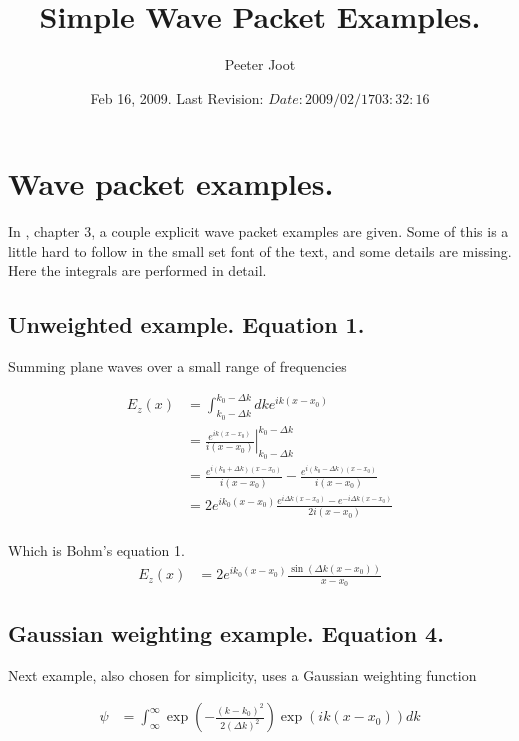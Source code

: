 \documentclass{article}
\title{ Simple Wave Packet Examples. }
\author{Peeter Joot}
\date{ Feb 16, 2009.  Last Revision: $Date: 2009/02/17 03:32:16 $ }
\begin{document}
\maketitle{}
\section{ Wave packet examples. }

In \cite{bohm1989qt}, chapter 3, a couple explicit wave packet examples are given.
Some of this is a little hard to follow in the small set font of the text, and some details are missing.  Here the integrals are performed
in detail.

\subsection{ Unweighted example. Equation 1. }

Summing plane waves over a small range of frequencies

\begin{align*}
E_z(x) 
&= \int_{k_0 -\Delta k}^{k_0 -\Delta k} dk e^{ik(x-x_0)} \\
&= {\left. \frac{e^{ik(x-x_0)}}{i(x-x_0)} \right\vert}_{k_0 -\Delta k}^{k_0 -\Delta k}  \\
&= \frac{e^{i(k_0 + \Delta k)(x-x_0)}}{i(x-x_0)} -\frac{e^{i(k_0 - \Delta k)(x-x_0)}}{i(x-x_0)} \\
&= 2 {e^{i k_0 (x-x_0)}}
 \frac{{e^{i \Delta k(x-x_0)}} -{e^{-i \Delta k(x-x_0)}}}{2 i (x-x_0)} \\
\end{align*}

Which is Bohm's equation 1.
\begin{align*}
E_z(x) &= 2 {e^{i k_0 (x-x_0)}} \frac{\sin( \Delta k (x-x_0))}{ x-x_0}
\end{align*}

\subsection{ Gaussian weighting example. Equation 4. }

Next example, also chosen for simplicity, uses a Gaussian weighting function

\begin{align*}
\psi 
&= \int_\infty^\infty 
\exp\left( - \frac{(k-k_0)^2}{2(\Delta k)^2} \right)
\exp\left( i k(x-x_0) \right) dk \\
\end{align*}
\end{document}
